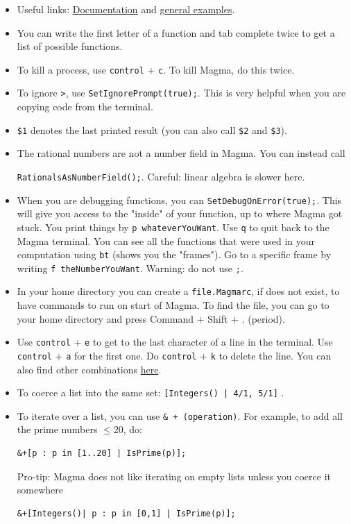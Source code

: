 \documentclass[12pt]{article}
\newcommand{\Magma}{\textsf{Magma}}
\begin{document}
\begin{itemize}
\item Useful links: \href{http://magma.maths.usyd.edu.au/magma/handbook/}{Documentation} and \href{http://magma.maths.usyd.edu.au/magma/pdf/examples.pdf}{general examples}.

\item You can write the first letter of a function and tab complete twice to get a list of possible functions.
\item To kill a process, use  \verb|control| + \verb|c|. To kill \textsf{Magma}, do this twice.
\item To ignore \verb|>|, use \verb|SetIgnorePrompt(true);|. This is very helpful when you are copying code from the terminal.
\item \verb|$1| denotes the last printed result (you can also call \verb|$2| and \verb|$3|).
\item The rational numbers are not a number field in \textsf{Magma}. You can instead call

\verb|RationalsAsNumberField();|.  Careful: linear algebra is slower here.

\item When you are debugging functions, you can \verb|SetDebugOnError(true);|. This will give you access to the "inside" of your function, up to where \textsf{Magma} got stuck. You print things by \verb|p whateverYouWant|.  Use \verb|q| to quit back to the \textsf{Magma} terminal.  You can see all the functions that were used in your computation using \verb|bt| (shows you the "frames").  Go to a specific frame by writing \verb|f theNumberYouWant|.  Warning: do not use \verb|;|.

\item In your home directory you can create a \verb|file.Magmarc|, if does not exist, to have commands to run on start of \Magma.  To find the file, you can go to your home directory and press Command + Shift + . (period).

\item Use \verb|control| + \verb|e| to get to the last character of a line in the terminal. Use \verb|control| + \verb|a| for the first one. Do \verb|control| + \verb|k| to delete the line.  You can also find other combinations \href{http://magma.maths.usyd.edu.au/magma/handbook/text/53}{here}.


\item To coerce a list into the same set: 
\verb+[Integers() | 4/1, 5/1]+ .

\item To iterate over a list, you can use \verb|& + (operation)|.  For example, to add all the prime numbers $\le 20$, do: \begin{verbatim}&+[p : p in [1..20] | IsPrime(p)];\end{verbatim}
Pro-tip: Magma does not like iterating on empty lists unless you coerce it somewhere \begin{verbatim}&+[Integers()| p : p in [0,1] | IsPrime(p)];\end{verbatim}


\end{itemize}
\end{document}
